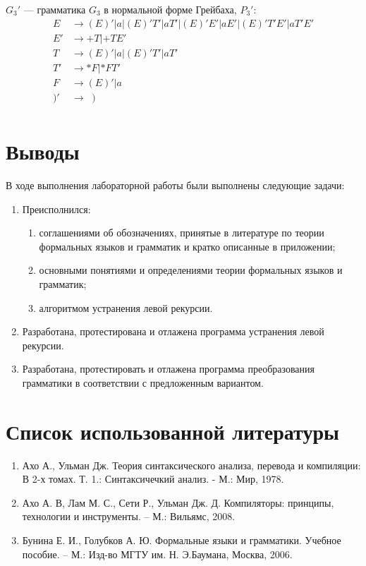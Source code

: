 \documentclass{bmstu-gost-7-32}
\begin{document}
$G_3'$ — грамматика $G_3$ в нормальной форме Грейбаха, $P_3'$:
\begin{equation}
	\begin{aligned}
		E &\to (E)' | a | (E)'T' | aT' | (E)'E' | aE' | (E)'T'E' | aT'E' \\
		E' &\to +T | +TE' \\
		T &\to (E)' | a | (E)'T' | aT' \\
		T' &\to *F | *FT' \\
		F &\to (E)' | a \\
		)' &\to \;\;) \\
	\end{aligned}
\end{equation}


\section*{Выводы}

В ходе выполнения лабораторной работы были выполнены следующие задачи:

\begin{enumerate}
	\item Преисполнился:
	\begin{enumerate}
		\item соглашениями об обозначениях, принятые в литературе по теории формальных языков и грамматик и кратко описанные в приложении;
		\item основными понятиями и определениями теории формальных языков и грамматик;
		\item алгоритмом устранения левой рекурсии.
	\end{enumerate}
	\item Разработана, протестирована и отлажена программа устранения левой рекурсии.
	\item Разработана, протестировать и отлажена программа преобразования грамматики в соответствии с предложенным вариантом.
\end{enumerate}

\section*{Список использованной литературы}

\begin{enumerate}
	\item Ахо А., Ульман Дж. Теория синтаксического анализа, перевода и компиляции: В 2-х томах. Т. 1.: Синтаксичечкий анализ. - М.: Мир, 1978.
	\item Ахо А. В, Лам М. С., Сети Р., Ульман Дж. Д. Компиляторы: принципы, технологии и инструменты. – М.: Вильямс, 2008.
	\item Бунина Е. И., Голубков А. Ю. Формальные языки и грамматики. Учебное пособие. – М.: Изд-во МГТУ им. Н. Э.Баумана, Москва, 2006.
\end{enumerate}
\end{document}

